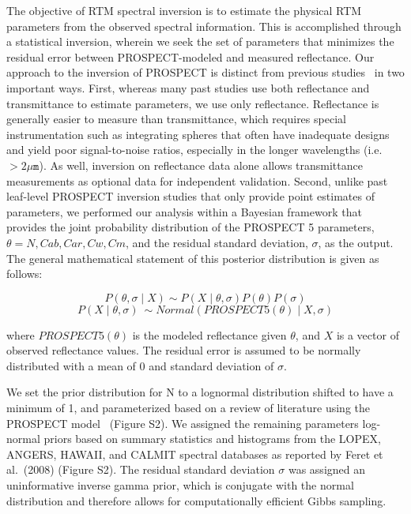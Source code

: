 The objective of RTM spectral inversion is to estimate the physical RTM parameters from the observed spectral information.
This is accomplished through a statistical inversion, wherein we seek the set of parameters that minimizes the residual error between PROSPECT-modeled and measured reflectance.
Our approach to the inversion of PROSPECT is distinct from previous studies~\cite{combal_2003_retrieval,feret_2008_prospect,feret_2011_optimizing,li_2011_retrieval,li_2013_retrieval} in two important ways.
First, whereas many past studies use both reflectance and transmittance to estimate parameters, we use only reflectance.
Reflectance is generally easier to measure than transmittance, which requires special instrumentation such as integrating spheres that often have inadequate designs and yield poor signal-to-noise ratios, especially in the longer wavelengths (i.e.\ $> 2 \mu \texttt{m}$).
As well, inversion on reflectance data alone allows transmittance measurements as optional data for independent validation.
Second, unlike past leaf-level PROSPECT inversion studies that only provide point estimates of parameters, we performed our analysis within a Bayesian framework that provides the joint probability distribution of the PROSPECT 5 parameters, $\theta = {N, Cab, Car, Cw, Cm}$, and the residual standard deviation, $\sigma$, as the output.
The general mathematical statement of this posterior distribution is given as follows:

\[ P(\theta, \sigma \mid X) \sim P(X \mid \theta, \sigma)P(\theta)P(\sigma) \]
\[ P(X \mid \theta, \sigma)\ \sim Normal(PROSPECT5(\theta) \mid X, \sigma) \]

where $PROSPECT5(\theta)$ is the modeled reflectance given $\theta$, and $X$ is a vector of observed reflectance values.
The residual error is assumed to be normally distributed with a mean of 0 and standard deviation of $\sigma$.

We set the prior distribution for N to a lognormal distribution shifted to have a minimum of 1, and parameterized based on a review of literature using the PROSPECT model~\cite{lemaire_2004_towards,ferreira_2013_analyzing,croft_2014_applicability} (Figure S2). %
We assigned the remaining parameters log-normal priors based on summary statistics and histograms from the LOPEX, ANGERS, HAWAII, and CALMIT spectral databases as reported by Feret et al.~(2008) \nocite{feret_2008_prospect} (Figure S2). %
The residual standard deviation $\sigma$ was assigned an uninformative inverse gamma prior, which is conjugate with the normal distribution and therefore allows for computationally efficient Gibbs sampling.

